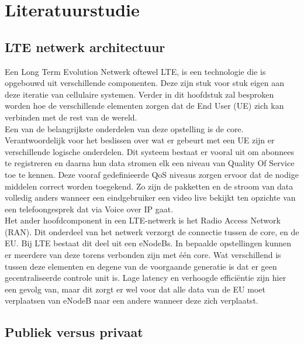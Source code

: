 
\section{Literatuurstudie}%
\label{sec:state-of-the-art}

\subsection{LTE netwerk architectuur}

Een Long Term Evolution Netwerk oftewel LTE, is een technologie die is opgebouwd uit verschillende componenten. Deze zijn stuk voor stuk eigen aan deze iteratie van cellulaire systemen. Verder in dit hoofdstuk zal besproken worden hoe de verschillende elementen zorgen dat de End User (UE) zich kan verbinden met de rest van de wereld.\\

Een van de belangrijkste onderdelen van deze opstelling is de core. Verantwoordelijk voor het beslissen over wat er gebeurt met een UE zijn er verschillende logische onderdelen. Dit systeem bestaat er vooral uit om abonnees te registreren en daarna hun data stromen elk een niveau van Quality Of Service toe te kennen. Deze vooraf gedefinieerde QoS niveaus zorgen ervoor dat de nodige middelen correct worden toegekend. Zo zijn de pakketten en de stroom van data volledig anders wanneer een eindgebruiker een video live bekijkt ten opzichte van een telefoongesprek dat via Voice over IP gaat. \autocite{Palat2011} \\

Het ander hoofdcomponent in een LTE-netwerk is het Radio Access Network (RAN). Dit onderdeel van het netwerk verzorgt de connectie tussen de core, en de EU. Bij LTE bestaat dit deel uit een eNodeBs. In bepaalde opstellingen kunnen er meerdere van deze torens verbonden zijn met één core. Wat verschillend is tussen deze elementen en degene van de voorgaande generatie is dat er geen gecentraliseerde controle unit is. Lage latency en verhoogde efficiëntie zijn hier een gevolg van, maar dit zorgt er wel voor dat alle data van de EU moet verplaatsen van eNodeB naar een andere wanneer deze zich verplaatst. \autocite{Palat2011} \\

\subsection{Publiek versus privaat}

